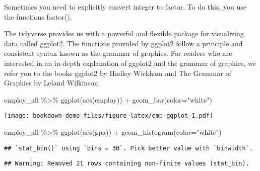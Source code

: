 \documentclass[
]{book}
\newenvironment{Shaded}{\begin{snugshade}}{\end{snugshade}}
\newcommand{\AttributeTok}[1]{\textcolor[rgb]{0.77,0.63,0.00}{#1}}
\newcommand{\FunctionTok}[1]{\textcolor[rgb]{0.00,0.00,0.00}{#1}}
\newcommand{\NormalTok}[1]{#1}
\newcommand{\OtherTok}[1]{\textcolor[rgb]{0.56,0.35,0.01}{#1}}
\newcommand{\SpecialCharTok}[1]{\textcolor[rgb]{0.00,0.00,0.00}{#1}}
\newcommand{\StringTok}[1]{\textcolor[rgb]{0.31,0.60,0.02}{#1}}
\begin{document}
Sometimes you need to explicitly convert integer to factor. To do this, you use the functions factor().

\begin{Shaded}
\end{Shaded}

The tidyverse provides us with a powerful and flexible package for visualizing data called ggplot2. The functions provided by ggplot2 follow a principle and consistent syntax known as the grammar of graphics. For readers who are interested in an in-depth explanation of ggplot2 and the grammar of graphics, we refer you to the books ggplot2 by Hadley Wickham and The Grammar of Graphics by Leland Wilkinson.

\begin{Shaded}
\begin{Highlighting}[]
\NormalTok{employ\_all }\SpecialCharTok{\%\textgreater{}\%}
  \FunctionTok{ggplot}\NormalTok{(}\FunctionTok{aes}\NormalTok{(employ)) }\SpecialCharTok{+}
  \FunctionTok{geom\_bar}\NormalTok{(}\AttributeTok{color=}\StringTok{"white"}\NormalTok{)}
\end{Highlighting}
\end{Shaded}

\texttt{[image: bookdown-demo\_files/figure-latex/emp-ggplot-1.pdf]}

\begin{Shaded}
\begin{Highlighting}[]
\NormalTok{employ\_all }\SpecialCharTok{\%\textgreater{}\%}
  \FunctionTok{ggplot}\NormalTok{(}\FunctionTok{aes}\NormalTok{(gpa)) }\SpecialCharTok{+}
  \FunctionTok{geom\_histogram}\NormalTok{(}\AttributeTok{color=}\StringTok{"white"}\NormalTok{)}
\end{Highlighting}
\end{Shaded}

\begin{verbatim}
## `stat_bin()` using `bins = 30`. Pick better value with `binwidth`.
\end{verbatim}

\begin{verbatim}
## Warning: Removed 21 rows containing non-finite values (stat_bin).
\end{verbatim}
\end{document}

